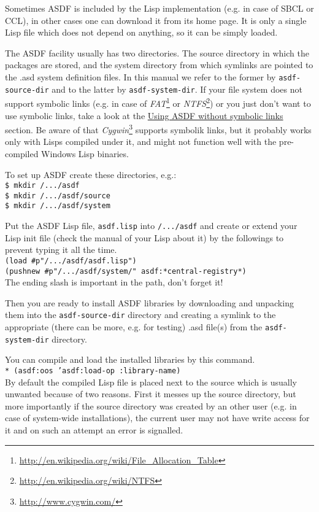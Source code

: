 \documentclass[11pt,a4paper,dvipdfm]{article}
\newcommand{\selfref}[1]{\href{#1}{#1}}
\newcommand{\footref}[2]{\textsl{#1}\footnote{\selfref{#2}}}
\newcommand{\prompttext}[1]{\texttt{#1}}
\newcommand{\shprompt}[1]{\prompttext{\$ #1}}
\newcommand{\lispprompt}[1]{\prompttext{* #1}}
\begin{document}
Sometimes ASDF is included by the Lisp implementation (e.g. in case of SBCL
or CCL), in other cases one can download it from its home page. It is only a
single Lisp file which does not depend on anything, so it can be simply loaded.

The ASDF facility usually has two directories. The source directory in which
the packages are stored, and the system directory from which symlinks are
pointed to the .asd system definition files. In this manual we refer to the
former by \prompttext{asdf-source-dir} and to the latter by
\prompttext{asdf-system-dir}. If your file system does not support symbolic
links (e.g. in case of 
\footref{FAT}{http://en.wikipedia.org/wiki/File\_Allocation\_Table} or
\footref{NTFS}{http://en.wikipedia.org/wiki/NTFS}) or you just don't
want to use symbolic links, take a look at the
\hyperlink{nosymlink}{Using ASDF without symbolic links} section. Be aware
of that \footref{Cygwin}{http://www.cygwin.com/} supports symbolik links,
but it probably works only with Lisps compiled under it, and might not
function well with the pre-compiled Windows Lisp binaries.

To set up ASDF create these directories, e.g.: \\
\shprompt{mkdir /.../asdf} \\
\shprompt{mkdir /.../asdf/source} \\
\shprompt{mkdir /.../asdf/system}

Put the ASDF Lisp file, \prompttext{asdf.lisp} into \prompttext{/.../asdf} and
create or extend your Lisp init file (check the manual of your Lisp
about it) by the followings to prevent typing it all the time. \\
\prompttext{(load \#p"/.../asdf/asdf.lisp")} \\
\prompttext{(pushnew \#p"/.../asdf/system/" asdf:*central-registry*)} \\
The ending slash is important in the path, don't forget it!

Then you are ready to install ASDF libraries by downloading and unpacking them
into the \prompttext{asdf-source-dir} directory and creating a symlink to the
appropriate (there can be more, e.g. for testing) .asd file(s) from the
\prompttext{asdf-system-dir} directory.

You can compile and load the installed libraries by this command. \\
\lispprompt{(asdf:oos 'asdf:load-op :library-name)} \\
By default the compiled Lisp file is placed next to the source which is
usually unwanted because of two reasons. First it messes up the source
directory, but more importantly if the source directory was created by an
other user (e.g. in case of system-wide installations), the current user may
not have write access for it and on such an attempt an error is signalled.
\end{document}
